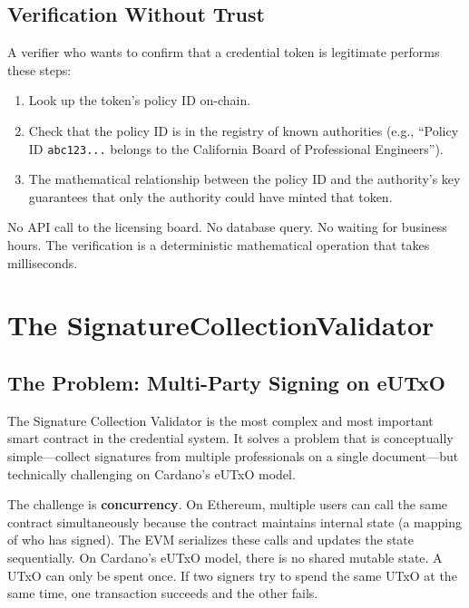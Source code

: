\subsection{Verification Without Trust}

A verifier who wants to confirm that a credential token is legitimate
performs these steps:
\begin{enumerate}[nosep]
  \item Look up the token's policy ID on-chain.
  \item Check that the policy ID is in the registry of known
    authorities (e.g., ``Policy ID \texttt{abc123...} belongs to the
    California Board of Professional Engineers'').
  \item The mathematical relationship between the policy ID and the
    authority's key guarantees that only the authority could have minted
    that token.
\end{enumerate}

No API call to the licensing board. No database query. No waiting for
business hours. The verification is a deterministic mathematical
operation that takes milliseconds.


\section{The SignatureCollectionValidator}
\label{sec:signature-collection-validator}

\subsection{The Problem: Multi-Party Signing on eUTxO}

The Signature Collection Validator is the most complex and most
important smart contract in the credential system. It solves a problem
that is conceptually simple---collect signatures from multiple
professionals on a single document---but technically challenging on
Cardano's eUTxO model.

The challenge is \textbf{concurrency}. On Ethereum, multiple users can
call the same contract simultaneously because the contract maintains
internal state (a mapping of who has signed). The EVM serializes these
calls and updates the state sequentially. On Cardano's eUTxO model,
there is no shared mutable state. A UTxO can only be spent once. If
two signers try to spend the same UTxO at the same time, one
transaction succeeds and the other fails.

